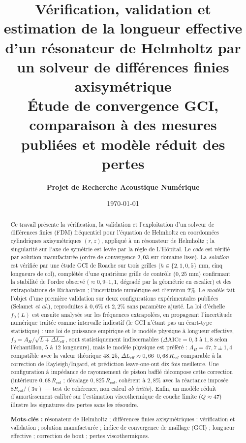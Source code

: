 \documentclass[11pt,a4paper,twocolumn]{article}
\title{\textbf{Vérification, validation et estimation de la longueur effective d'un résonateur de Helmholtz par un solveur de différences finies axisymétrique} \\ \large Étude de convergence GCI, comparaison à des mesures publiées et modèle réduit des pertes}
\author{\textbf{Projet de Recherche Acoustique Numérique}}
\date{\today}
\begin{document}
\maketitle

\begin{abstract}
Ce travail présente la vérification, la validation et l'exploitation d'un solveur de différences finies (FDM) fréquentiel pour l'équation de Helmholtz en coordonnées cylindriques axisymétriques $(r,z)$, appliqué à un résonateur de Helmholtz ; la singularité sur l'axe de symétrie est levée par la règle de L'Hôpital. Le \emph{code} est vérifié par solution manufacturée (ordre de convergence $2{,}03$ sur domaine lisse). La \emph{solution} est vérifiée par une étude GCI de Roache sur trois grilles ($h \in \{2, 1, 0{,}5\}\text{ mm}$, cinq longueurs de col), complétée d'une quatrième grille de contrôle ($0{,}25$ mm) confirmant la stabilité de l'ordre observé ($\approx 0{,}9$–$1{,}1$, dégradé par la géométrie en escalier) et des extrapolations de Richardson ; l'incertitude numérique est d'environ $2\%$. Le \emph{modèle} fait l'objet d'une première validation sur deux configurations expérimentales publiées (Selamet \emph{et al.}), reproduites à $0{,}6\%$ et $2{,}2\%$ sans paramètre ajusté. La loi d'échelle $f_0(L)$ est ensuite analysée sur les fréquences extrapolées, en propageant l'incertitude numérique traitée comme intervalle indicatif (le GCI n'étant pas un écart-type statistique) : une loi de puissance empirique et le modèle physique à longueur effective, $f_0 = A_H/\sqrt{L + \Delta L_{\mathrm{eff}}}$, sont statistiquement indiscernables ($\Delta\text{AICc} = 0{,}3$ à $1{,}8$ selon l'échantillon, $5$ à $12$ longueurs), mais le modèle physique est préféré : $A_H = 47{,}7 \pm 1{,}4$ compatible avec la valeur théorique $48{,}25$, $\Delta L_{\mathrm{eff}} \approx 0{,}66$–$0{,}68\,R_{col}$ comparable à la correction de Rayleigh/Ingard, et prédiction leave-one-out dix fois meilleure. Une configuration à impédance de rayonnement de piston bafflé décompose cette correction (intérieure $0{,}68\,R_{col}$ ; décalage $0{,}825\,R_{col}$, cohérent à $2{,}8\%$ avec la réactance imposée $8R_{col}/(3\pi)$ — test de cohérence, non calcul \emph{ab initio}). Enfin, un modèle réduit d'amortissement calibré sur l'estimation viscothermique de couche limite ($Q\approx47$) illustre les signatures des pertes sans les résoudre.

\vspace{0.5em}
\noindent\textbf{Mots-clés :} résonateur de Helmholtz ; différences finies axisymétriques ; vérification et validation ; solution manufacturée ; indice de convergence de maillage (GCI) ; longueur effective ; correction de bout ; pertes viscothermiques.
\end{abstract}
\end{document}
